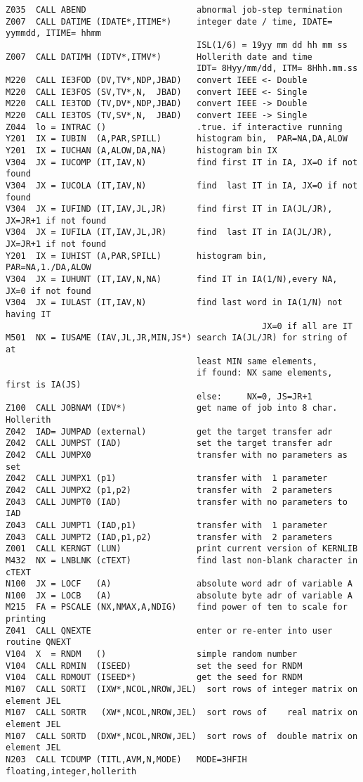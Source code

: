 \begin{verbatim}
Z035  CALL ABEND                      abnormal job-step termination
Z007  CALL DATIME (IDATE*,ITIME*)     integer date / time, IDATE= yymmdd, ITIME= hhmm
                                      ISL(1/6) = 19yy mm dd hh mm ss
Z007  CALL DATIMH (IDTV*,ITMV*)       Hollerith date and time
                                      IDT= 8Hyy/mm/dd, ITM= 8Hhh.mm.ss
M220  CALL IE3FOD (DV,TV*,NDP,JBAD)   convert IEEE <- Double
M220  CALL IE3FOS (SV,TV*,N,  JBAD)   convert IEEE <- Single
M220  CALL IE3TOD (TV,DV*,NDP,JBAD)   convert IEEE -> Double
M220  CALL IE3TOS (TV,SV*,N,  JBAD)   convert IEEE -> Single
Z044  lo = INTRAC ()                  .true. if interactive running
Y201  IX = IUBIN  (A,PAR,SPILL)       histogram bin,  PAR=NA,DA,ALOW
Y201  IX = IUCHAN (A,ALOW,DA,NA)      histogram bin IX
V304  JX = IUCOMP (IT,IAV,N)          find first IT in IA, JX=O if not found
V304  JX = IUCOLA (IT,IAV,N)          find  last IT in IA, JX=O if not found
V304  JX = IUFIND (IT,IAV,JL,JR)      find first IT in IA(JL/JR), JX=JR+1 if not found
V304  JX = IUFILA (IT,IAV,JL,JR)      find  last IT in IA(JL/JR), JX=JR+1 if not found
Y201  IX = IUHIST (A,PAR,SPILL)       histogram bin,  PAR=NA,1./DA,ALOW
V304  JX = IUHUNT (IT,IAV,N,NA)       find IT in IA(1/N),every NA, JX=0 if not found
V304  JX = IULAST (IT,IAV,N)          find last word in IA(1/N) not having IT
                                                   JX=0 if all are IT
M501  NX = IUSAME (IAV,JL,JR,MIN,JS*) search IA(JL/JR) for string of at
                                      least MIN same elements,
                                      if found: NX same elements, first is IA(JS)
                                      else:     NX=0, JS=JR+1
Z100  CALL JOBNAM (IDV*)              get name of job into 8 char. Hollerith
Z042  IAD= JUMPAD (external)          get the target transfer adr
Z042  CALL JUMPST (IAD)               set the target transfer adr
Z042  CALL JUMPX0                     transfer with no parameters as set
Z042  CALL JUMPX1 (p1)                transfer with  1 parameter
Z042  CALL JUMPX2 (p1,p2)             transfer with  2 parameters
Z043  CALL JUMPT0 (IAD)               transfer with no parameters to IAD
Z043  CALL JUMPT1 (IAD,p1)            transfer with  1 parameter
Z043  CALL JUMPT2 (IAD,p1,p2)         transfer with  2 parameters
Z001  CALL KERNGT (LUN)               print current version of KERNLIB
M432  NX = LNBLNK (cTEXT)             find last non-blank character in cTEXT
N100  JX = LOCF   (A)                 absolute word adr of variable A
N100  JX = LOCB   (A)                 absolute byte adr of variable A
M215  FA = PSCALE (NX,NMAX,A,NDIG)    find power of ten to scale for printing
Z041  CALL QNEXTE                     enter or re-enter into user routine QNEXT
V104  X  = RNDM   ()                  simple random number
V104  CALL RDMIN  (ISEED)             set the seed for RNDM
V104  CALL RDMOUT (ISEED*)            get the seed for RNDM
M107  CALL SORTI  (IXW*,NCOL,NROW,JEL)  sort rows of integer matrix on element JEL
M107  CALL SORTR   (XW*,NCOL,NROW,JEL)  sort rows of    real matrix on element JEL
M107  CALL SORTD  (DXW*,NCOL,NROW,JEL)  sort rows of  double matrix on element JEL
N203  CALL TCDUMP (TITL,AVM,N,MODE)   MODE=3HFIH  floating,integer,hollerith
\end{verbatim}

